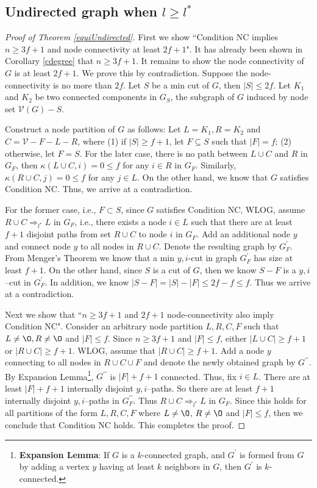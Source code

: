 \documentclass[letterpaper, 11pt]{article}
\newcommand{\calV}{{\mathcal{V}}}
\begin{document}
\subsection{Undirected graph when $l\ge l^*$}
\begin{proof}[Proof of Theorem \ref{equiUndirected}]
First we show ``Condition NC implies $n\ge 3f+1$ and node connectivity at least $2f+1$". It has already been shown in Corollary \ref{cdegree} that $n\ge 3f+1$. It remains to show the node connectivity of $G$ is at least $2f+1$.
We prove this by contradiction. Suppose the node-connectivity is no more than $2f$. Let $S$ be a min cut of $G$, then $|S|\le 2f$.
Let $K_1$ and $K_2$ be two connected components in $G_S$, the subgraph of $G$ induced by node set $\calV(G)-S$.

Construct a node partition of $G$ as follows:
Let $L=K_1, R=K_2$ and $C=\calV-F-L-R$, where (1) if $|S|\ge f+1$, let $F\subseteq S$ such that $|F|=f$; (2) otherwise, let $F=S$.  For the later case, there is no path between $L\cup C$ and $R$ in $G_F$, then $\kappa(L\cup C, i)=0\le f$ for any $i\in R$ in $G_F$. Similarly, $\kappa(R\cup C, j)=0\le f$ for any $j\in L$. On the other hand, we know that $G$ satisfies Condition NC. Thus, we arrive at a contradiction.

For the former case, i.e., $F\subset S$, since $G$ satisfies Condition NC, WLOG, assume $R\cup C\Rightarrow_{l^*} L$ in $G_F$, i.e., there exists a node $i\in L$ such that there are at least $f+1$ disjoint paths from set $R\cup C$ to node $i$ in $G_F$. Add an additional node $y$ and connect node $y$ to all nodes in $R\cup C$.
Denote the resulting graph by $G_F^{\prime}$.  From Menger's Theorem we know that a min $y, i$-cut in graph $G_F^{\prime}$ has size at least $f+1$. On the other hand, since $S$ is a cut of $G$, then we know $S-F$ is a $y, i$--cut in $G_F^{\prime}$. In addition, we know $|S-F|=|S|-|F|\le 2f-f\le f$. Thus we arrive at a contradiction.




Next we show that ``$n\ge 3f+1$ and $2f+1$ node-connectivity also imply Condition NC". Consider an arbitrary node partition $L, R, C, F$ such that $L\not=\O, R\not=\O$ and $|F|\le f$. Since $n\ge 3f+1$ and $|F|\le f$, either $|L\cup C|\ge f+1$ or $|R\cup C|\ge f+1$. WLOG, assume that $|R\cup C|\ge f+1$. Add a node $y$ connecting to all nodes in $R\cup C \cup F$ and denote the newly obtained graph by $G^{\prime\prime}$. By Expansion Lemma\footnote{\textbf{Expansion Lemma}: If $G$ is a $k$-connected graph, and $G^{\prime}$ is formed from $G$ by adding a vertex $y$ having at least $k$ neighbors in $G$, then $G^{\prime}$ is $k$-connected. }, $G^{\prime\prime}$ is $|F|+f+1$ connected. Thus, fix $i\in L$. There are at least $|F|+f+1$ internally disjoint $y, i$--paths. So there are at least $f+1$ internally disjoint $y, i$--paths in $G^{\prime\prime}_F$. Thus $R\cup C\Rightarrow_{l^*} L$ in $G_F$. Since this holds for all partitions of the form $L, R, C, F$ where $L\not=\O$, $R\not=\O$ and $|F|\le f$, then we conclude that Condition NC holds. This completes the proof.



\end{proof}
\end{document}
